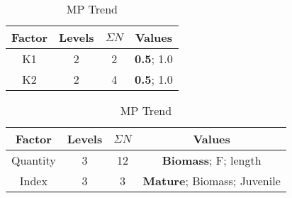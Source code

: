 \documentclass[]{article}
\begin{document}
\begin{table}
\begin{center}
\begin{tabular}{|cccc|}
\hline
{\tiny Factor} & {\tiny Levels} & {\tiny $\Sigma N$} & {\tiny Values} \\
\hline\hline
{\tiny K1} 				& {\tiny 2}   & {\tiny 2}  & {\tiny  \textbf{0.5}; 1.0}      		\\
{\tiny K2} 				& {\tiny 2}   & {\tiny 4}  & {\tiny  \textbf{0.5}; 1.0}      		\\
\hline
\end{tabular}
\end{center}
\caption{MP Trend}
\label{tab:mp1}
\end{table}


\begin{table}
\begin{center}
\begin{tabular}{|cccc|}
\hline
{\tiny Factor} & {\tiny Levels} & {\tiny $\Sigma N$} & {\tiny Values} \\
\hline\hline
{\tiny Quantity}& {\tiny 3}   & {\tiny 12} & {\tiny  \textbf{Biomass}; F; length}      	 \\
{\tiny Index} 	& {\tiny 3}   & {\tiny 3}  & {\tiny  \textbf{Mature}; Biomass; Juvenile} \\
\hline
\end{tabular}
\end{center}
\caption{MP Trend}
\label{tab:mp2}
\end{table}
\end{document}

